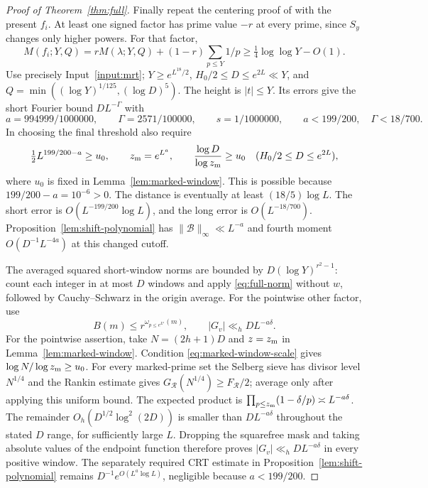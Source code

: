 \documentclass[11pt]{article}
\theoremstyle{definition}
\theoremstyle{remark}
\numberwithin{equation}{section}
\begin{document}
\begin{proof}[Proof of Theorem~\ref{thm:full}]
Finally repeat the centering proof of \cite[Lemmas~4.1--4.2, 4.4, pp.~13--16]{OpenAI007} with the present $f_i$.
At least one signed factor has prime value $-r$ at every prime, since $S_y$ changes only higher powers.
For that factor,
\begin{equation}\label{eq:full-signed-distance}
 M(f_i;Y,Q)=rM(\lambda;Y,Q)+(1-r)\sum_{p\le Y}1/p
 \ge\tfrac14\log\log Y-O(1).
\end{equation}
Use precisely Input~\ref{input:mrt}; $Y\ge e^{L^{18}/2}$, $H_0/2\le D\le e^{2L}\ll Y$, and
$Q=\min((\log Y)^{1/125},(\log D)^5)$. The height is $|t|\le Y$.
Its errors give the short Fourier bound $DL^{-\Gamma}$ with
\begin{equation}\label{eq:full-centering-parameters}
 a=994999/1000000,\qquad\Gamma=2571/100000,\qquad s=1/1000000,
 \qquad a<199/200,\quad\Gamma<18/700.
\end{equation}
In choosing the final threshold also require
\begin{equation}\label{eq:marked-window-scale}
 \tfrac12L^{199/200-a}\ge u_0,\qquad z_{\rm m}=e^{L^a},\qquad
 \frac{\log D}{\log z_{\rm m}}\ge u_0
 \quad(H_0/2\le D\le e^{2L}),
\end{equation}
where $u_0$ is fixed in Lemma~\ref{lem:marked-window}. This is possible because $199/200-a=10^{-6}>0$.
The distance is eventually at least $(18/5)\log L$. The short error is
$O(L^{-199/200}\log L)$, and the long error is $O(L^{-18/700})$.
Proposition~\ref{lem:shift-polynomial} has $\|\mathcal B\|_\infty\ll L^{-a}$ and fourth moment
$O(D^{-1}L^{-4a})$ at this changed cutoff.

The averaged squared short-window norms are bounded by $D(\log Y)^{r^2-1}$:
count each integer in at most $D$ windows and apply \eqref{eq:full-norm} without $w$, followed by Cauchy--Schwarz
in the origin average. For the pointwise other factor, use
\begin{equation}\label{eq:full-pointwise}
 B(m)\le r^{\omega_{p\le e^{L^a}}(m)},\qquad |G_v|\ll_h DL^{-a\delta}.
\end{equation}
For the pointwise assertion, take $N=(2h+1)D$ and $z=z_{\rm m}$ in Lemma~\ref{lem:marked-window}.
Condition \eqref{eq:marked-window-scale} gives $\log N/\log z_{\rm m}\ge u_0$.
For every marked-prime set the Selberg sieve has divisor level $N^{1/4}$ and the Rankin estimate gives
$G_{\mathcal R}(N^{1/4})\ge F_{\mathcal R}/2$; average only after applying this uniform bound.
The expected product is $\prod_{p\le z_{\rm m}}(1-\delta/p)\asymp L^{-a\delta}$.
The remainder $O_h(D^{1/2}\log^2(2D))$ is smaller than $DL^{-a\delta}$ throughout the stated $D$ range,
for sufficiently large $L$. Dropping the squarefree mask and taking absolute values of the endpoint function
therefore proves $|G_v|\ll_h DL^{-a\delta}$ in every positive window. The separately required CRT estimate in
Proposition~\ref{lem:shift-polynomial} remains $D^{-1}e^{O(L^a\log L)}$, negligible because $a<199/200$.


\end{proof}
\end{document}
